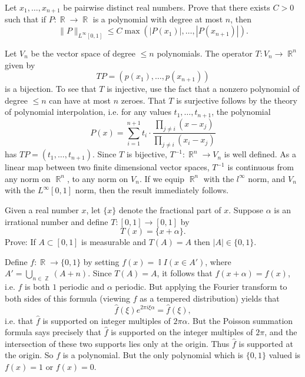 \documentclass[answers]{exam}
\DeclareMathOperator{\RR}{\mathbb{R}}
\DeclareMathOperator{\ZZ}{\mathbb{Z}}
\DeclareMathOperator{\II}{\mathbb{I}}
\begin{document}
\begin{questions}
\question Let $x_1,\dots,x_{n+1}$ be pairwise distinct real numbers. Prove that there exists $C > 0$ such that if $P: \RR \to \RR$ is a polynomial with degree at most $n$, then
%
\[ \| P \|_{L^\infty[0,1]}\leq C \max \left( |P(x_1)|, \dots, |P(x_{n+1})| \right). \]
\begin{solution}
	Let $V_n$ be the vector space of degree $\leq n$ polynomials. The operator $T: V_n \to \RR^n$ given by
	\[ TP = ( p(x_1), \dots, p(x_{n+1}) ) \]
	is a bijection. To see that $T$ is injective, use the fact that a nonzero polynomial of degree $\leq n$ can have at most $n$ zeroes. That $T$ is surjective follows by the theory of polynomial interpolation, i.e. for any values $t_1,\dots,t_{n+1}$, the polynomial
	\[ P(x) = \sum_{i = 1}^{n+1} t_i \cdot \frac{\prod_{j \neq i} (x - x_j)}{\prod_{j \neq i} (x_i - x_j)} \]
	has $TP = (t_1,\dots,t_{n+1})$. Since $T$ is bijective, $T^{-1}: \RR^n \to V_n$ is well defined. As a linear map between two finite dimensional vector spaces, $T^{-1}$ is continuous from any norm on $\RR^n$, to any norm on $V_n$. If we equip $\RR^n$ with the $l^\infty$ norm, and $V_n$ with the $L^\infty[0,1]$ norm, then the result immediately follows.
\end{solution}

\question Given a real number $x$, let $\{ x \}$ denote the fractional part of $x$. Suppose $\alpha$ is an irrational number and define $T: [0,1] \to [0,1]$ by
%
\[ T(x) = \{ x + \alpha \}. \]
%
Prove: If $A \subset [0,1]$ is measurable and $T(A) = A$ then $|A| \in \{ 0, 1 \}$.
\begin{solution}
	Define $f: \RR \to \{ 0, 1 \}$ by setting $f(x) = \II{I}(x \in A')$, where $A' = \bigcup_{n \in \ZZ} (A + n)$. Since $T(A) = A$, it follows that $f(x + \alpha) = f(x)$, i.e. $f$ is both $1$ periodic and $\alpha$ periodic. But applying the Fourier transform to both sides of this formula (viewing $f$ as a tempered distribution) yields that
	\[ \widehat{f}(\xi) e^{2 \pi i \xi \alpha} = \widehat{f}(\xi), \]
	i.e. that $\widehat{f}$ is supported on integer multiples of $2 \pi \alpha$. But the Poisson summation formula says precisely that $\widehat{f}$ is supported on the integer multiples of $2 \pi$, and the intersection of these two supports lies only at the origin. Thus $\widehat{f}$ is supported at the origin. So $f$ is a polynomial. But the only polynomial which is $\{ 0,1 \}$ valued is $f(x) = 1$ or $f(x) = 0$.


\end{solution}
\end{questions}
\end{document}
